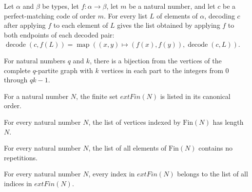 \begin{theorem}
\label{FABL.decodePerfectMatchingCode_map}
\leanok
{}
Let $\alpha$ and $\beta$ be types, let $f:\alpha\to\beta$, let $m$ be a natural number,
and let $c$ be a perfect-matching code of order $m$. For every list $L$ of elements of
$\alpha$, decoding $c$ after applying $f$ to each element of $L$ gives the list obtained
by applying $f$ to both endpoints of each decoded pair:
$\operatorname{decode}(c,f(L))=\operatorname{map}((x,y)\mapsto(f(x),f(y)),\operatorname{decode}(c,L))$.
\end{theorem}

\begin{definition}
\label{FABL.bookVertexFinEquiv}
\leanok
{}
For natural numbers $q$ and $k$, there is a bijection from the vertices of the complete
$q$-partite graph with $k$ vertices in each part to the integers from $0$ through
$qk-1$.
\end{definition}

\begin{definition}
\label{FABL.finVertexList}
\leanok
For a natural number $N$, the finite set $	ext{Fin}(N)$ is listed in its canonical
order.
\end{definition}

\begin{theorem}
\label{FABL.length_finVertexList}
\leanok
{}
For every natural number $N$, the list of vertices indexed by $\mathrm{Fin}(N)$ has
length $N$.
\end{theorem}

\begin{theorem}
\label{FABL.nodup_finVertexList}
\leanok
{}
For every natural number $N$, the list of all elements of $\text{Fin}(N)$ contains no
repetitions.
\end{theorem}

\begin{theorem}
\label{FABL.mem_finVertexList}
\leanok
{}
For every natural number $N$, every index in $	ext{Fin}(N)$ belongs to the list of all
indices in $	ext{Fin}(N)$.
\end{theorem}


